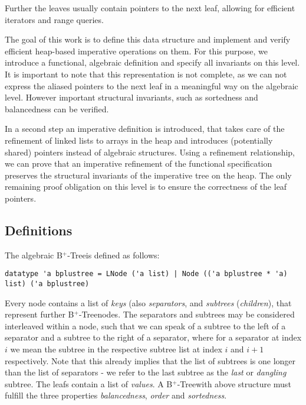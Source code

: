 \documentclass[a4paper,UKenglish,cleveref, autoref, thm-restate]{lipics-v2021}
\newcommand{\btree}{B$^+$-Tree}
\begin{document}
Further the leaves usually contain pointers
to the next leaf, allowing for efficient iterators and range queries.

The goal of this work is to define this data structure
and implement and verify efficient heap-based imperative operations on them.
For this purpose, we introduce a functional, algebraic definition and
specify all invariants on this level.
It is important to note that this representation is not complete,
as we can not express the aliased pointers to the next leaf in a meaningful
way on the algebraic level.
However important structural invariants, such as sortedness and balancedness
can be verified.

In a second step an imperative definition is introduced,
that takes care of the refinement of linked lists to arrays in the heap
and introduces (potentially shared) pointers instead of algebraic structures.
Using a refinement relationship, we can prove that an imperative refinement
of the functional specification preserves the structural invariants
of the imperative tree on the heap.
The only remaining proof obligation on this level is to ensure the correctness
of the leaf pointers.


\subsection{Definitions}
\label{sec:data_structure_defs}


The algebraic \btree is defined as follows:

\begin{lstlisting}[mathescape=true, language=Isabelle,label=lst:btree-def]
    datatype 'a bplustree = LNode ('a list) | Node (('a bplustree * 'a) list) ('a bplustree)
\end{lstlisting}


Every node contains a list of \textit{keys} (also \textit{separators}, and \textit{subtrees} (\textit{children}),
that represent further \btree nodes.
The separators and subtrees may be considered interleaved within a node,
such that we can speak of a subtree to the left of a separator and
a subtree to the right of a separator,
where for a separator at index $i$ we mean the subtree in the respective
subtree list at index $i$ and $i+1$ respectively.
Note that this already implies that the list of subtrees is one
longer than the list of separators - we refer to the last subtree
as the \textit{last} or \textit{dangling} subtree.
The leafs contain a list of \textit{values}.
A \btree with above structure must fulfill the three properties
\textit{balancedness}, \textit{order} and \textit{sortedness}.
\end{document}
